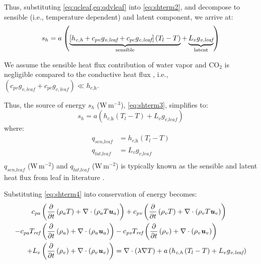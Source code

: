 Thus, substituting \cref{eq:qcleaf,eq:qdvleaf} into \cref{eq:shterm2}, and decompose to sensible (i.e., temperature dependent) and latent component, we arrive at:
\begin{equation}
{s_h} = a{\mkern 1mu} \left( {\underbrace {\left[ {{h_{\textit{c,h}}} + {c_{pv}}{g_{\textit{v,leaf}}} + {c_{pc}}{g_{\textit{c,leaf}}}} \right]\left( {{T_l} - T} \right)}_{\mathrm{sensible}} + \underbrace {{L_v}{g_{\textit{v,leaf}}}}_{\mathrm{latent}}} \right)
\label{eq:shterm3}
\end{equation}

\begin{assumption}
We assume the  sensible heat flux contribution of water vapor and CO$_2$ is negligible compared to the conductive heat flux \citep{Hiraoka2005}, i.e.,\newline $\left(c_{pv}g_{v,leaf} + c_{pc}g_{c,leaf} \right)\ll h_{\textit{c,h}}$.
\end{assumption}

Thus, the source of energy $s_h$ (W\,m$^{-3}$), \cref{eq:shterm3}, simplifies to:
\begin{equation}
{s_h} = a \left( h_{\textit{c,h}} \left(T_l - T\right) + L_v g_{\textit{v,leaf}} \right)
\label{eq:shterm4}
\end{equation}
where:
\begin{align}
	q_{\textit{sen,leaf}} &= h_{\textit{c,h}} \left(T_l - T\right) \label{eq:qsenleaf2} \\
	q_{\textit{lat,leaf}} &= L_v g_{\textit{v,leaf}} \label{eq:qlatleaf2} \\
\end{align}
$q_{\textit{sen,leaf}}$ (W\,m$^{-2}$) and $q_{\textit{lat,leaf}}$ (W\,m$^{-2}$) is typically known as the sensible and latent heat flux from leaf in literature \citep{Manickathan2018a,Hiraoka2005,Bruse1998}. 


Substituting \cref{eq:shterm4} into conservation of energy becomes:
\begin{equation}
\begin{split}
c_{\textit{pa}}  &\left( \frac{\partial }{\partial t} \left( \rho_a T \right) + \nabla\cdot \left(\rho_a T \textbf{\textit{u}}_a \right)  \right) + c_{\textit{pv}} \left( \frac{\partial }{\partial t} \left( \rho_v T \right) + \nabla \cdot\left(\rho_v T \textbf{\textit{u}}_v \right)  \right) \\ 
- c_{\textit{pa}} T_{\textit{ref}} &\left( \frac{\partial }{\partial t} \left( \rho_a \right) + \nabla \cdot\left(\rho_a \textbf{\textit{u}}_a \right)  \right) - c_{\textit{pv}} T_{\textit{ref}} \left( \frac{\partial }{\partial t} \left( \rho_v \right) + \nabla \cdot\left(\rho_v \textbf{\textit{u}}_v \right)  \right) \\
+ L_v &\left( \frac{\partial }{\partial t} \left( \rho_v \right) + \nabla\cdot \left(\rho_v \textbf{\textit{u}}_v \right)  \right) =  \nabla  \cdot \left(\lambda \nabla T \right) + a \left( h_{\textit{c,h}} \left(T_l - T\right) + L_v g_{\textit{v,leaf}} \right)
\end{split}
\label{eq:energy8}
\end{equation}

